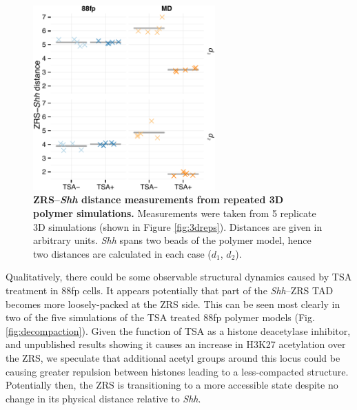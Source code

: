 \documentclass[a4paper,11pt,oneside]{book}
\begin{document}
\begin{figure}
\begin{center} 
\includegraphics[width=2.75in]{3d_dists.pdf}
\captionsetup{width=\textwidth} 
\caption[ ZRS--\emph{Shh} distance measurements from repeated 3D polymer simulations. ]{ {\bf ZRS--\emph{Shh} distance measurements from repeated 3D polymer simulations. }
Measurements were taken from 5 replicate 3D simulations (shown in Figure \ref{fig:3dreps}). Distances are given in arbitrary units. \emph{Shh} spans two beads of the polymer model, hence two distances are calculated in each case ($d_1$, $d_2$).
}\label{fig:3ddist}
\end{center} 
\end{figure} 

Qualitatively, there could be some observable structural dynamics caused by TSA treatment in 88fp cells. It appears potentially that part of the \emph{Shh}--ZRS TAD becomes more loosely-packed at the ZRS side. This can be seen most clearly in two of the five simulations of the TSA treated 88fp polymer models (Fig. \ref{fig:decompaction}). Given the function of TSA as a histone deacetylase inhibitor, and unpublished results showing it causes an increase in H3K27 acetylation over the ZRS, we speculate that additional acetyl groups around this locus could be causing greater repulsion between histones leading to a less-compacted structure. Potentially then, the ZRS is transitioning to a more accessible state despite no change in its physical distance relative to \emph{Shh}.
\end{document}
